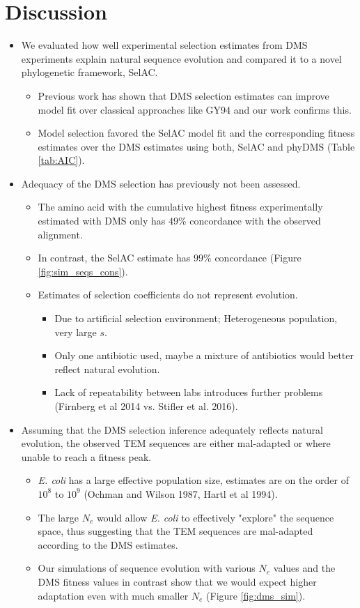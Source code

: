 \documentclass[12pt]{article}
\begin{document}
\section*{Discussion}
\begin{itemize}
	\item We evaluated how well experimental selection estimates from DMS experiments explain natural sequence evolution and compared it to a novel phylogenetic framework, SelAC.
	\begin{itemize}
		\item Previous work has shown that DMS selection estimates can improve model fit over classical approaches like GY94 and our work confirms this.
		\item Model selection favored the SelAC model fit and the corresponding fitness estimates over the DMS estimates using both, SelAC and phyDMS (Table \ref{tab:AIC}).
	\end{itemize}

	\item Adequacy of the DMS selection has previously not been assessed.
	\begin{itemize}	
		\item The amino acid with the cumulative highest fitness experimentally estimated with DMS only has $49 \%$ concordance with the observed alignment.
		\item In contrast, the SelAC estimate has $99 \%$ concordance (Figure \ref{fig:sim_seqs_cons}). 
		\item Estimates of selection coefficients do not represent evolution.
 		\begin{itemize}
			\item Due to artificial selection environment; Heterogeneous population, very large $s$. 
			\item Only one antibiotic used, maybe a mixture of antibiotics would better reflect natural evolution.
			\item Lack of repeatability between labs introduces further problems (Firnberg et al 2014 vs. Stifler et al. 2016).
		\end{itemize}
	\end{itemize}

	\item Assuming that the DMS selection inference adequately reflects natural evolution, the observed TEM sequences are either mal-adapted or where unable to reach a fitness peak.
	\begin{itemize}
		\item \textit{E. coli} has a large effective population size, estimates are on the order of $10^8$ to $10^9$ (Ochman and Wilson 1987, Hartl et al 1994).
		\item The large $N_e$ would allow \textit{E. coli} to effectively "explore" the sequence space, thus suggesting that the TEM sequences are mal-adapted according to the DMS estimates.
		\item Our simulations of sequence evolution with various $N_e$ values and the DMS fitness values in contrast show that we would expect higher adaptation even with much smaller $N_e$ (Figure \ref{fig:dms_sim}).
	\end{itemize}


\end{itemize}
\end{document}

